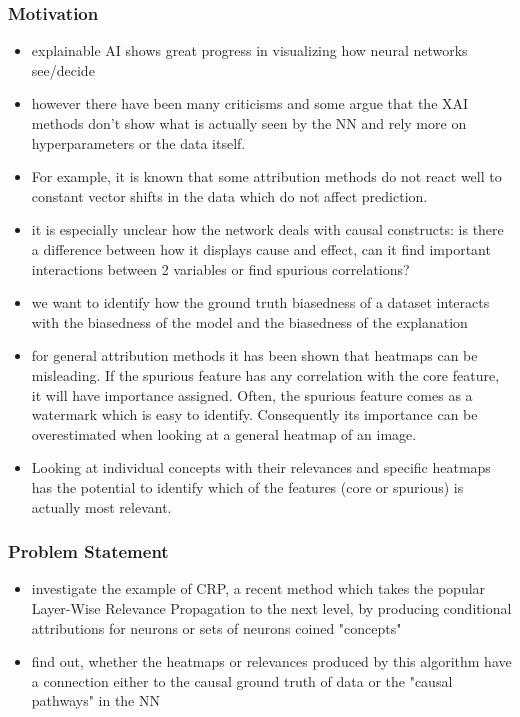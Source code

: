 \subsubsection{Motivation}
\begin{itemize}
    \item explainable AI shows great progress in visualizing how neural networks see/decide
    \item however there have been many criticisms and some argue that the XAI methods don't show what is actually seen by the NN and rely more on hyperparameters or the data itself.
    \item For example, it is known that some attribution methods do not react well to constant vector shifts in the data which do not affect prediction.
    \item it is especially unclear how the network deals with causal constructs: is there a difference between how it displays cause and effect, can it find important interactions between 2 variables or find spurious correlations?
    \item we want to identify how the ground truth biasedness of a dataset interacts with the biasedness of the model and the biasedness of the explanation
    \item for general attribution methods it has been shown that heatmaps can be misleading. If the spurious feature has any correlation with the core feature, it will have importance assigned. Often, the spurious feature comes as a watermark which is easy to identify. Consequently its importance can be overestimated when looking at a general heatmap of an image.
    \item Looking at individual concepts with their relevances and specific heatmaps has the potential to identify which of the features (core or spurious) is actually most relevant.
\end{itemize}

\subsubsection{Problem Statement}
\begin{itemize}
    \item investigate the example of CRP, a recent method which takes the popular Layer-Wise Relevance Propagation to the next level, by producing conditional attributions for neurons or sets of neurons coined "concepts"
    \item find out, whether the heatmaps or relevances produced by this algorithm have a connection either to the causal ground truth of data or the "causal pathways" in the NN
\end{itemize}

